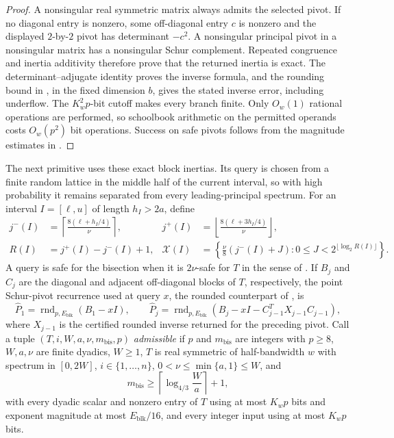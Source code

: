 \documentclass[11pt]{article}
\begin{document}
\begin{proof}
A nonsingular real symmetric matrix always admits the selected pivot.  If no
diagonal entry is nonzero, some off-diagonal entry $c$ is nonzero and the
displayed $2$-by-$2$ pivot has determinant $-c^2$.  A nonsingular principal
pivot in a nonsingular matrix has a nonsingular Schur complement.  Repeated
congruence and inertia additivity therefore prove that the returned inertia
is exact.  The determinant--adjugate identity proves the inverse formula, and
the rounding bound in , in the fixed
dimension $b$, gives the stated inverse error, including underflow.  The
$K_w^2p$-bit cutoff makes every branch finite.  Only $O_w(1)$ rational
operations are performed, so schoolbook arithmetic on the permitted operands
costs $O_w(p^2)$ bit operations.  Success on safe pivots follows from the
magnitude estimates in .
\end{proof}

The next primitive uses these exact block inertias.  Its query is chosen from
a finite random lattice in the middle half of the current interval, so with
high probability it remains separated from every leading-principal spectrum.
For an interval $I=[\ell,u]$ of length $h_I>2a$, define
\begin{align}
 j^-(I)&=\left\lceil\frac{8(\ell+h_I/4)}{\nu}\right\rceil,
 &
 j^+(I)&=\left\lfloor\frac{8(\ell+3h_I/4)}{\nu}\right\rfloor,\\
 R(I)&=j^+(I)-j^-(I)+1,
 &
 \mathcal X(I)&=
 \left\{\frac\nu8(j^-(I)+J):
 0\leq J<2^{\lfloor\log_2R(I)\rfloor}\right\}.
 \label{eq:bisection-lattice}
\end{align}
A query is safe for the bisection when it is $2\nu$-safe for $T$ in the
sense of .  If $B_j$ and $C_j$ are the diagonal and
adjacent off-diagonal blocks of $T$, respectively, the point Schur-pivot
recurrence used at query $x$, the rounded counterpart of
, is
\begin{equation}
 \label{eq:rounded-block-pivots}
 \widehat P_1=\operatorname{rnd}_{p,E_{\mathrm{blk}}}(B_1-xI),
 \qquad
 \widehat P_j=\operatorname{rnd}_{p,E_{\mathrm{blk}}}
 (B_j-xI-C_{j-1}^TX_{j-1}C_{j-1}),
\end{equation}
where $X_{j-1}$ is the certified rounded inverse returned for the preceding
pivot.  Call a tuple
$(T,i,\allowbreak W,a,\allowbreak \nu,m_{\mathrm{bis}},\allowbreak p)$
\emph{admissible} if $p$ and
$m_{\mathrm{bis}}$ are integers with $p\geq8$, $W,a,\nu$ are finite dyadics,
$W\geq1$,
$T$ is real symmetric of half-bandwidth $w$ with spectrum in $[0,2W]$,
$i\in\{1,\ldots,n\}$,
$0<\nu\leq\min\{a,1\}\leq W$, and
\[
 m_{\mathrm{bis}}\geq
 \left\lceil\log_{4/3}\frac{W}{a}\right\rceil+1,
\]
with every dyadic scalar and nonzero entry of $T$ using at most $K_wp$ bits
and exponent magnitude at most $E_{\mathrm{blk}}/16$, and every integer input
using at most $K_wp$ bits.
\end{document}
